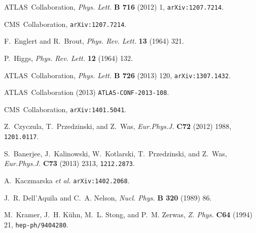 \documentclass[12pt]{article}
\begin{document}
\providecommand{\href}[2]{#2}\begingroup\begin{thebibliography}{10}

ATLAS~Collaboration, {\em Phys. Lett.} {\bf B 716} (2012) 1,
\href{http://arXiv.org/abs/arXiv:1207.7214}{{\tt arXiv:1207.7214}}.

CMS~Collaboration,
\href{http://arXiv.org/abs/arXiv:1207.7214}{{\tt arXiv:1207.7214}}.

F.~Englert and R.~Brout, {\em Phys. Rev. Lett.} {\bf 13} (1964)
321.

P.~Higgs, {\em Phys. Rev. Lett.} {\bf 12} (1964)
132.

ATLAS~Collaboration, {\em Phys. Lett.} {\bf B 726} (2013) 120,
\href{http://arXiv.org/abs/arXiv:1307.1432}{{\tt arXiv:1307.1432}}.

ATLAS~Collaboration (2013)
\href{http://www.arXiv.org/abs/ATLAS-CONF-2013-108}{{\tt ATLAS-CONF-2013-108}}.

CMS~Collaboration,
\href{http://arXiv.org/abs/arXiv:1401.5041}{{\tt arXiv:1401.5041}}.

Z.~Czyczula, T.~Przedzinski, and Z.~Was, {\em Eur.Phys.J.} {\bf C72} (2012)
  1988,
\href{http://www.arXiv.org/abs/1201.0117}{{\tt 1201.0117}}.

S.~Banerjee, J.~Kalinowski, W.~Kotlarski, T.~Przedzinski, and Z.~Was, {\em
  Eur.Phys.J.} {\bf C73} (2013) 2313,
\href{http://www.arXiv.org/abs/1212.2873}{{\tt 1212.2873}}.

A.~Kaczmarska {\em et al.} 
\href{http://www.arXiv.org/abs/arXiv:1402.2068}{{\tt arXiv:1402.2068}}.

J.~R. Dell'Aquila and C.~A. Nelson, {\em Nucl. Phys.} {\bf B 320} (1989)
86.

M.~Kramer, J.~H. K\"u{hn}, M.~L. Stong, and P.~M. Zerwas, {\em Z. Phys.} {\bf
  C64} (1994) 21,
\href{http://arXiv.org/abs/hep-ph/9404280}{{\tt hep-ph/9404280}}.


\end{thebibliography}
\end{document}

